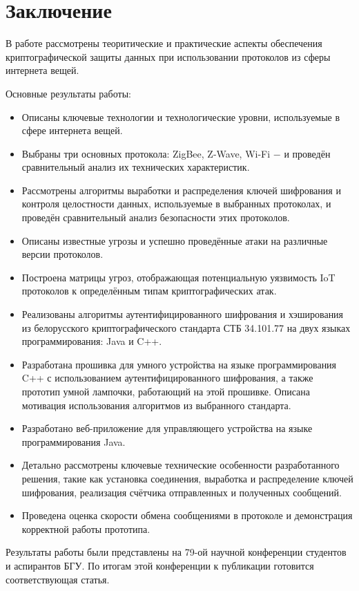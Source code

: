 \chapter*{Заключение}
	
	В работе рассмотрены теоритические и практические аспекты обеспечения криптографической защиты 
	данных при использовании протоколов из сферы интернета вещей.
	
	Основные результаты работы:
	
	\begin{itemize}
		\item Описаны ключевые технологии и технологические уровни, используемые в сфере интернета вещей.
		\item Выбраны три основных протокола: ZigBee, Z-Wave, Wi-Fi $-$ и проведён сравнительный анализ
		их технических характеристик.
		\item Рассмотрены алгоритмы выработки и распределения ключей шифрования и контроля целостности
		данных, используемые в выбранных протоколах, и проведён сравнительный анализ безопасности этих
		протоколов.
		\item Описаны известные угрозы и успешно проведённые атаки на различные версии протоколов.
		\item Построена матрицы угроз, отображающая потенциальную уязвимость IoT протоколов к 
		определённым типам криптографических атак.
		\item Реализованы алгоритмы аутентифицированного шифрования и хэширования из белорусского 
		криптографического стандарта СТБ 34.101.77 на двух языках программирования: Java и C++.
		\item Разработана прошивка для умного устройства на языке программирования C++ с использованием 
		аутентифицированного шифрования, а также прототип умной лампочки, работающий на этой прошивке. Описана 
		мотивация использования алгоритмов из выбранного стандарта.
		\item Разработано веб-приложение для управляющего устройства на языке программирования Java.
		\item Детально рассмотрены ключевые технические особенности разработанного решения, такие как 
		установка соединения, выработка и распределение ключей шифрования, реализация счётчика отправленных 
		и полученных сообщений.
		\item Проведена оценка скорости обмена сообщениями в протоколе и демонстрация корректной работы 
		прототипа.
	\end{itemize}

	Результаты работы были представлены на 79-ой научной конференции студентов и аспирантов БГУ.
	По итогам этой конференции к публикации готовится соответствующая статья.
